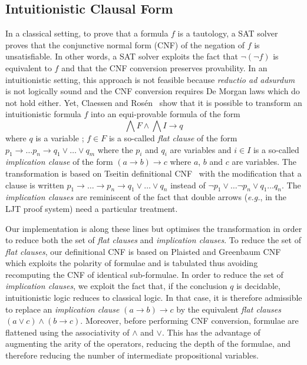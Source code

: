 \documentclass[utf8,a4paper,UKenglish,cleveref, autoref, thm-restate]{lipics-v2019}
\begin{document}
\subsection{Intuitionistic Clausal Form}


In a classical setting, to prove that a formula $f$ is a tautology, a
SAT solver proves that the conjunctive normal form (CNF) of the
negation of $f$ is unsatisfiable. In other words, a SAT solver
exploits the fact that $\neg (\neg f)$ is equivalent to $f$ and that
the CNF conversion preserves provability.
%
In an intuitionistic setting, this approach is not feasible because
\emph{reductio ad adsurdum} is not logically sound and
the CNF conversion requires De Morgan laws which do not hold either.
%
Yet, Claessen and Rosén~\cite{ClaessenR15} show that it is possible to
transform an intuitionistic  formula $f$ into an equi-provable formula of the form
\[
  \bigwedge F \land \bigwedge I \to q
\]
where $q$ is a variable ; $f \in F$ is a so-called \emph{flat clause} of the
form $p_1 \to \dots p_n \to q_1 \lor \dots \lor q_m$ where the $p_i$
and $q_i$ are variables and $i\in I$ is a so-called \emph{implication clause}
of the form $(a\to b) \to c $ where $a$, $b$ and $c$ are variables.
%
The transformation is based on Tseitin definitional CNF~\cite{Tseitin1983} with the
modification that a clause is written
$p_1 \to \dots \to p_n \to q_1 \lor \dots \lor q_n$ instead of
$\neg p_1 \lor \dots \neg p_n \lor q_1 \dots q_n$.
%
The \emph{implication clauses} are reminiscent of the fact that double
arrows (\emph{e.g.}, in the LJT proof system) need a particular
treatment. %

Our implementation is along these lines but optimises the
transformation in order to reduce both the set of \emph{flat clauses}
and \emph{implication clauses}.  To reduce the set of \emph{flat
  clauses}, our definitional CNF is based on Plaisted and Greenbaum
CNF~\cite{PlaistedG86} which exploits the polarity of formulae and is
tabulated thus avoiding recomputing the CNF of identical sub-formulae.
%
In order to reduce the set of \emph{implication clauses}, we exploit
the fact that, if the conclusion $q$ is decidable, intuitionistic logic reduces to
classical logic. In that case, it is therefore
admissible to replace an \emph{implication clause} $(a \to b) \to c$
by the equivalent \emph{flat clauses} $(a\lor c) \land (b \to c)$.
%
Moreover, before performing CNF conversion, formulae are flattened
using the associativity of $\land$ and $\lor$. This has the advantage
of augmenting the arity of the operators, reducing the depth of the
formulae, and therefore reducing the number of intermediate propositional variables.
\end{document}
